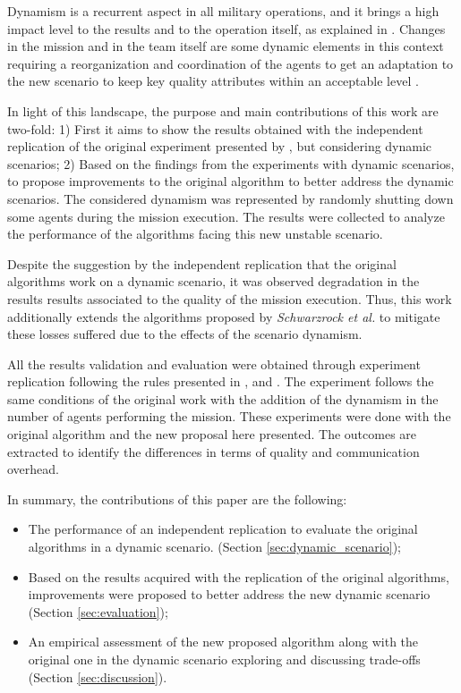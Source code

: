 Dynamism is a recurrent aspect in all military operations, and it brings a high impact level to the results and to the operation itself, as explained in \cite{CC02}. Changes in the mission and in the team itself are some dynamic elements in this context requiring a reorganization and coordination of the agents to get an adaptation to the new scenario to keep key quality attributes within an acceptable level \cite{FRANCE2014}. 

In light of this landscape, the purpose and main contributions of this work are two-fold: 1) First it aims to show the results obtained with the independent replication of the original experiment presented by \cite{MAS07}, but considering dynamic scenarios; 2) Based on the findings from the experiments with dynamic scenarios, to propose improvements to the original algorithm to better address the dynamic scenarios. The considered dynamism was represented by randomly shutting down some agents during the mission execution. The results were collected to analyze the performance of the algorithms facing this new unstable scenario.

Despite the suggestion by the independent replication that the original algorithms work \cite{MAS07} on a dynamic scenario, it was observed degradation in the results results associated to the quality of the mission execution. Thus, this work additionally extends the algorithms proposed by \textit{Schwarzrock et al.} to mitigate these losses suffered due to the effects of the scenario dynamism.

All the results validation and evaluation were obtained through experiment replication following the rules presented in \cite{exp01}, \cite{exp03} and \cite{exp04}. The experiment follows the same conditions of the original work with the addition of the dynamism in the number of agents performing the mission. These experiments were done with the original algorithm and the new proposal here presented. The outcomes are extracted to identify the differences in terms of quality and communication overhead.

In summary, the contributions of this paper are the following:

\begin{itemize}
   \item The performance of an independent replication to evaluate the original algorithms in a dynamic scenario. (Section \ref{sec:dynamic_scenario});
   \item Based on the results acquired with the replication of the original algorithms, improvements were proposed to better address the new dynamic scenario (Section \ref{sec:evaluation});
   \item An empirical assessment of the new proposed algorithm along with the original one in the dynamic scenario exploring and discussing trade-offs (Section \ref{sec:discussion}).
\end{itemize}

